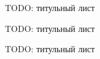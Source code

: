 \thispagestyle{empty}

TODO: титульный лист

\newpage

TODO: титульный лист
\newpage

TODO: титульный лист
\newpage
